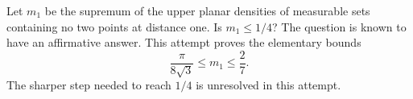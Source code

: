 Let $m_1$ be the supremum of the upper planar densities of measurable
sets containing no two points at distance one. Is $m_1\leq1/4$?
The question is known to have an affirmative answer. This attempt
proves the elementary bounds
\[
 \frac{\pi}{8\sqrt3}\leq m_1\leq\frac27.
\]
The sharper step needed to reach $1/4$ is unresolved in this attempt.
